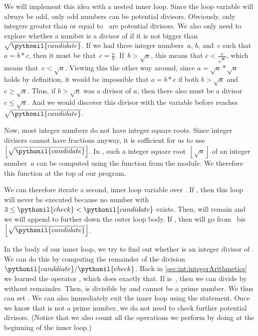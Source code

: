 We will implement this idea with a nested inner loop.
Since the loop variable  will always be odd, only odd numbers can be potential divisors.
Obviously, only integers greater than or equal to~ are potential divisors.
We also only need to explore whether a number  is a divisor of  if it is not bigger than $\sqrt{\pythonil{candidate}}$.
If we had three integer numbers~$a$, $b$, and~$c$ such that $a=b*c$, then it must be that~$c=\frac{a}{b}$.
If~$b>\sqrt{a}$, this means that $c<\frac{a}{\sqrt{a}}$, which means that~$c<\sqrt{a}$.
Viewing this the other way around, since $a=\sqrt{a}*\sqrt{a}$ holds by definition, it would be impossible that $a=b*c$ if both $b>\sqrt{a}$ and $c\geq\sqrt{a}$.
Thus, if $b>\sqrt{a}$ was a divisor of $a$, then there also must be a divisor $c\leq\sqrt{a}$.
And we would discover this divisor with the variable  before  reaches~$\sqrt{\pythonil{candidate}}$.

Now, most integer numbers do not have integer square roots.
Since integer divisors cannot have fractions anyway, it is sufficient for us to use $\left\lfloor\sqrt{\pythonil{candidate}}\right\rfloor$.
In \python, such a  integer square root~$\left\lfloor\sqrt{a}\right\rfloor$ of an integer number~$a$ can be computed using the  function from the  module.
We therefore  this function at the top of our program.%
%
\begin{sloppypar}%
We can therefore iterate a second, inner loop variable  over .
If , then this loop will never be executed because no number  with $3\leq\pythonil{check}<\pythonil{candidate}$ exists.
Then,  will remain  and we will append  to  further down the outer loop body.
If , then  will go from~ bis~$\left\lfloor\sqrt{\pythonil{candidate}}\right\rfloor$.%
\end{sloppypar}%
%
In the body of our inner loop, we try to find out whether  is an integer divisor of .
We can do this by computing the remainder of the division~$\pythonil{canddiate}/\pythonil{check}$.
Back in \cref{sec:int:integerArithmetics} we learned the  operator \expandafter\pythonilIdx{\%}, which does exactly that.
If  is~, then we can divide  by  without remainder.
Then,  is divisible by  and cannot be a prime number.
We thus can set .
We can also immediately exit the inner loop using the  statement.
Once we know that  is not a prime number, we do not need to check further potential divisors.
(Notice that we also count all the  operations we perform by doing  at the beginning of the inner loop.)


